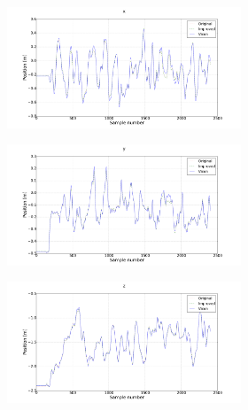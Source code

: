 \begin{figure}
  \begin{subfigure}{0.48\textwidth}
    \begin{subfigure}{\textwidth}
      \includegraphics[clip, trim = 100 0 100 0, width=\textwidth]{figures/chapter3/x}
    \end{subfigure}
    \begin{subfigure}{\textwidth}
      \includegraphics[clip, trim = 100 0 100 0, width=\textwidth]{figures/chapter3/y}
    \end{subfigure}
    \begin{subfigure}{\textwidth}
      \includegraphics[clip, trim = 100 0 100 0, width=\textwidth]{figures/chapter3/z}

\end{subfigure}
\end{subfigure}
\end{figure}
